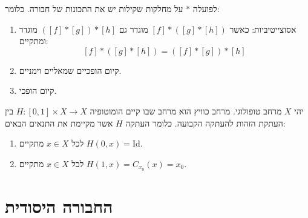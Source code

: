 \documentclass{tstextbook}
\begin{document}
\begin{proposition}
לפועלה \(*\) על מחלקות שקילות יש את התכונות של חבורה. כלומר:

  \begin{enumerate}
    \item אסוצייטיביות: כאשר \([f]*([g]*[h])\) מוגדר גם \(([f]*[g])*[h]\) מוגדר ומתקיים: 
$$[f]*([g]*[h])=([f]*[g])*[h]$$


    \item קיום הופכיים שמאליים וימניים. 


    \item קיום הופכי. 


  \end{enumerate}
\end{proposition}
\begin{definition}
יהי \(X\) מרחב טופולוגי. מרחב כוויץ הוא מרחב שבו קיים הומוטופיה \(H:[0,1]\times X\to X\) בין העתקת הזהות להעתקה הקבועה. כלומר העתקה \(H\) אשר מקיימת את התנאים הבאים:

  \begin{enumerate}
    \item לכל \(x \in X\) מתקיים \(H(0,x)=\mathrm{Id}\). 


    \item לכל \(x \in X\) מתקיים \(H(1,x)=C_{x_{0}}(x)=x_{0}\). 


  \end{enumerate}
\end{definition}
\section{החבורה היסודית}
\end{document}
